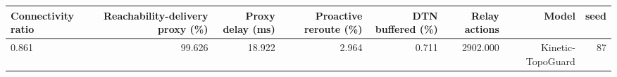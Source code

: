 \begin{tabular}{lrrrrrrr}
\toprule
Connectivity ratio & Reachability-delivery proxy (\%) & Proxy delay (ms) & Proactive reroute (\%) & DTN buffered (\%) & Relay actions & Model & seed \\
\midrule
0.861 & 99.626 & 18.922 & 2.964 & 0.711 & 2902.000 & Kinetic-TopoGuard & 87 \\
\bottomrule
\end{tabular}